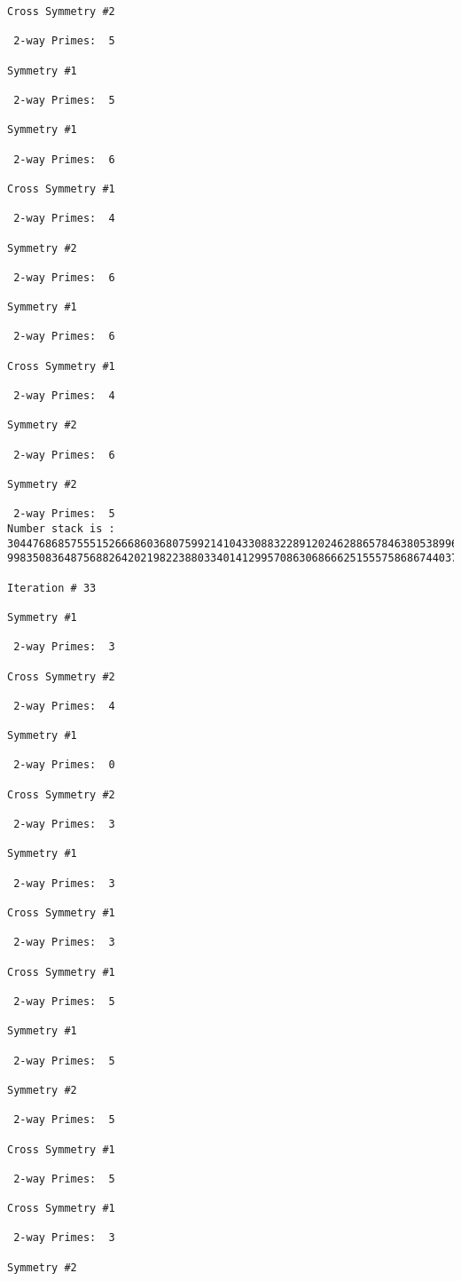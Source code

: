 {{{{\begin{verbatim}
Cross Symmetry #2

 2-way Primes: 	5

Symmetry #1

 2-way Primes: 	5

Symmetry #1

 2-way Primes: 	6

Cross Symmetry #1

 2-way Primes: 	4

Symmetry #2

 2-way Primes: 	6

Symmetry #1

 2-way Primes: 	6

Cross Symmetry #1

 2-way Primes: 	4

Symmetry #2

 2-way Primes: 	6

Symmetry #2

 2-way Primes: 	5
Number stack is :
30447686857555152666860368075992141043308832289120246288657846380538996794608835958544046240163340857
99835083648756882642021982238803340141299570863068666251555758686744037580433610426404458595388064976

Iteration #	33

Symmetry #1

 2-way Primes: 	3

Cross Symmetry #2

 2-way Primes: 	4

Symmetry #1

 2-way Primes: 	0

Cross Symmetry #2

 2-way Primes: 	3

Symmetry #1

 2-way Primes: 	3

Cross Symmetry #1

 2-way Primes: 	3

Cross Symmetry #1

 2-way Primes: 	5

Symmetry #1

 2-way Primes: 	5

Symmetry #2

 2-way Primes: 	5

Cross Symmetry #1

 2-way Primes: 	5

Cross Symmetry #1

 2-way Primes: 	3

Symmetry #2


\end{verbatim}}}}}
